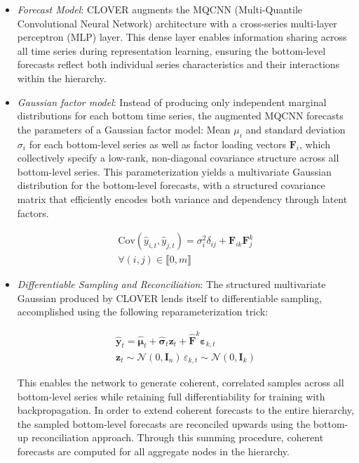 \documentclass[letterpaper]{article}
\begin{document}
\begin{itemize}
     
\item \textit{Forecast Model}: CLOVER augments the MQCNN (Multi-Quantile Convolutional Neural Network) \cite{MQCNN} architecture with a cross-series multi-layer perceptron (MLP) layer. This dense layer enables information sharing across all time series during representation learning, ensuring the bottom-level forecasts reflect both individual series characteristics and their interactions within the hierarchy.


\item \textit{Gaussian factor model}: Instead of producing only independent marginal distributions for each bottom time series, the augmented MQCNN forecasts the parameters of a Gaussian factor model: Mean $\mu_i$ and standard deviation $\sigma_i$ for each bottom-level series as well as factor loading vectors $\mathbf{F}_i$, which collectively specify a low-rank, non-diagonal covariance structure across all bottom-level series. This parameterization yields a multivariate Gaussian distribution for the bottom-level forecasts, with a structured covariance matrix that efficiently encodes both variance and dependency through latent factors.

\begin{multline}
    \mathrm{Cov}(\hat{y}_{i,t}, \hat{y}_{j,t}) = \sigma^2_i\delta_{ij} + \mathbf{F}_{ik} \mathbf{F}_{j}^k \\ 
    \forall (i,j) \in  \llbracket 0, m \rrbracket 
\end{multline}


\item \textit{Differentiable Sampling and Reconciliation}:
The structured multivariate Gaussian produced by CLOVER lends itself to differentiable sampling, accomplished using the following reparameterization trick: 

\begin{multline}
    \hat{\mathbf{y}}_t = \hat{\mathbf{\mu}}_t + \mathbf{\hat{\sigma}}_t \mathbf{z}_t + \hat{\mathbf{F}}^k\mathbf{\varepsilon}_{k,t}\\
    \mathbf{z}_t \sim \mathcal{N}(0,\mathbf{I}_n) \,\varepsilon_{k,t} \sim \mathcal{N}(0,\mathbf{I}_k)
\end{multline}

This enables the network to generate coherent, correlated samples across all bottom-level series while retaining full differentiability for training with backpropagation. In order to extend coherent forecasts to the entire hierarchy, the sampled bottom-level forecasts are reconciled upwards using the bottom-up reconciliation approach. Through this summing procedure, coherent forecasts are computed for all aggregate nodes in the hierarchy.


\end{itemize}
\end{document}
